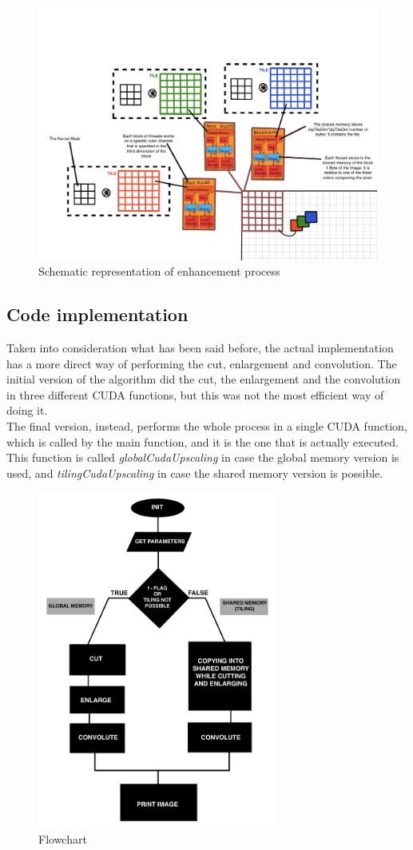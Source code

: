     \begin{figure}
        \centering
        \includegraphics[width=1\textwidth]{img/scheme.png}
        \caption{Schematic representation of enhancement process}
        \label{fig:tiling}
    \end{figure}

    \subsection{Code implementation}
    Taken into consideration what has been said before, the actual implementation has a more direct way of performing the cut, enlargement and convolution.
    The initial version of the algorithm did the cut, the enlargement and the convolution in three different CUDA functions, but this was not the most efficient way of doing it.\\
    The final version, instead, performs the whole process in a single CUDA function, which is called by the main function, and it is the one that is actually executed.
    This function is called \textit{globalCudaUpscaling} in case the global memory version is used, and \textit{tilingCudaUpscaling} in case the shared memory version is possible.

    \begin{figure}[h]
        \centering
        \includegraphics[width=0.7\textwidth]{img/flowchart.png}
        \caption{Flowchart}
        \label{fig:flowchart}
    \end{figure}